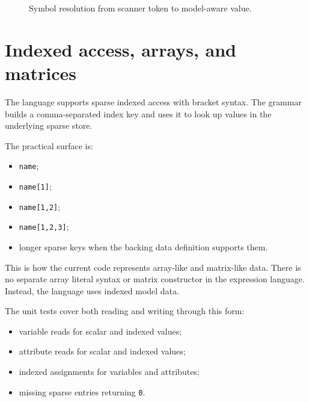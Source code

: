 \begin{figure}[htbp]
\centering
\caption{Symbol resolution from scanner token to model-aware value.}
\label{fig:expression-symbol-resolution}
\end{figure}

\section{Indexed access, arrays, and matrices}
\label{sec:expression-reference-indexing}

The language supports sparse indexed access with bracket syntax. The grammar
builds a comma-separated index key and uses it to look up values in the
underlying sparse store.

The practical surface is:
\begin{itemize}
\item \texttt{name};
\item \texttt{name[1]};
\item \texttt{name[1,2]};
\item \texttt{name[1,2,3]};
\item longer sparse keys when the backing data definition supports them.
\end{itemize}

This is how the current code represents array-like and matrix-like data. There
is no separate array literal syntax or matrix constructor in the expression
language. Instead, the language uses indexed model data.

The unit tests cover both reading and writing through this form:
\begin{itemize}
\item variable reads for scalar and indexed values;
\item attribute reads for scalar and indexed values;
\item indexed assignments for variables and attributes;
\item missing sparse entries returning \texttt{0}.
\end{itemize}

